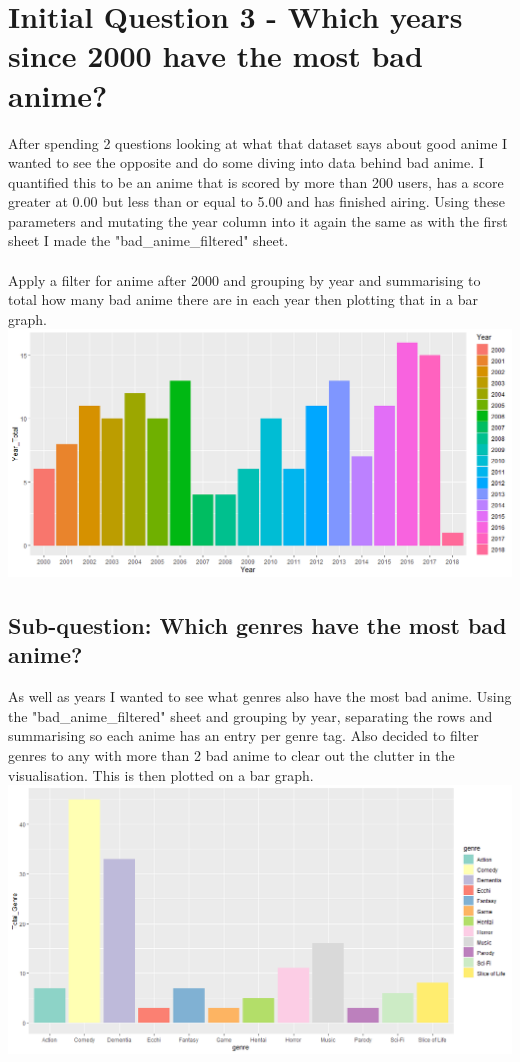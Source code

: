 \documentclass[a4paper]{article}
\begin{document}
	\section* {Initial Question 3 - Which years since 2000 have the most bad anime?}
	After spending 2 questions looking at what that dataset says about good anime I wanted to see the opposite and do some diving into data behind bad anime. I quantified this to be an anime that is scored by more than 200 users, has a score greater at 0.00 but less than or equal to 5.00 and has finished airing. Using these parameters and mutating the year column into it again the same as with the first sheet I made the "bad\_anime\_filtered" sheet.\\
	\\
	Apply a filter for anime after 2000 and grouping by year and summarising to total how many bad anime there are in each year then plotting that in a bar graph.\\ 
	\noindent\includegraphics[scale=0.60]{BadAnimeByYear.png}
	
	\pagebreak
	
	\subsection*{Sub-question: Which genres have the most bad anime?}
	As well as years I wanted to see what genres also have the most bad anime. Using the "bad\_anime\_filtered" sheet and grouping by year, separating the rows and summarising so each anime has an entry per genre tag. Also decided to filter genres to any with more than 2 bad anime to clear out the clutter in the visualisation. This is then plotted on a bar graph.\\
	\noindent\includegraphics[scale=0.60]{BadAnimeByGenre.png}
	
\end{document}
